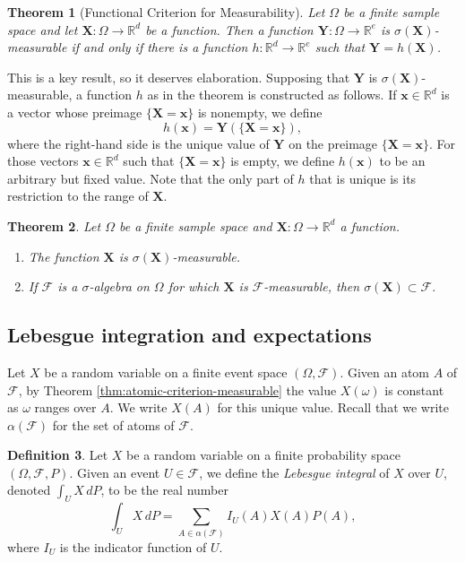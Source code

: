 \documentclass[reqno]{amsart}
\newtheorem{thm}{Theorem}[section]
\theoremstyle{definition}
\newtheorem{defn}[thm]{Definition}
\numberwithin{equation}{section}
\begin{document}
\begin{thm}[Functional Criterion for Measurability]\label{thm:functional-criterion-measurable}
Let $\Omega$ be a finite sample space and let $\mathbf{X}: \Omega \to \mathbb{R}^d$ be a function. Then a function $\mathbf{Y}: \Omega \to \mathbb{R}^e$ is $\sigma(\mathbf{X})$-measurable if and only if there is a function $h: \mathbb{R}^d \to \mathbb{R}^e$ such that $\mathbf{Y} = h(\mathbf{X})$.
\end{thm}

This is a key result, so it deserves elaboration. Supposing that $\mathbf{Y}$ is $\sigma(\mathbf{X})$-measurable, a function $h$ as in the theorem is constructed as follows. If $\mathbf{x}\in \mathbb{R}^d$ is a vector whose preimage $\{\mathbf{X} = \mathbf{x}\}$ is nonempty, we define
	\[
	h(\mathbf{x}) = \mathbf{Y}(\{\mathbf{X} = \mathbf{x}\}),
	\]
where the right-hand side is the unique value of $\mathbf{Y}$ on the preimage $\{\mathbf{X} = \mathbf{x}\}$. For those vectors $\mathbf{x}\in \mathbb{R}^d$ such that $\{\mathbf{X} = \mathbf{x}\}$ is empty, we define $h(\mathbf{x})$ to be an arbitrary but fixed value. Note that the only part of $h$ that is unique is its restriction to the range of $\mathbf{X}$.


\begin{thm}
Let $\Omega$ be a finite sample space and $\mathbf{X}: \Omega \to \mathbb{R}^d$ a function.
\begin{enumerate}
\item The function $\mathbf{X}$ is $\sigma(\mathbf{X})$-measurable.
\item If $\mathcal{F}$ is a $\sigma$-algebra on $\Omega$ for which $\mathbf{X}$ is $\mathcal{F}$-measurable, then $\sigma(\mathbf{X}) \subset \mathcal{F}$.
\end{enumerate}
\end{thm}

\subsection{Lebesgue integration and expectations}

Let $X$ be a random variable on a finite event space $(\Omega, \mathcal{F})$. Given an atom $A$ of $\mathcal{F}$, by Theorem \ref{thm:atomic-criterion-measurable} the value $X(\omega)$ is constant as $\omega$ ranges over $A$. We write $X(A)$ for this unique value. Recall that we write $\alpha(\mathcal{F})$ for the set of atoms of $\mathcal{F}$.

\begin{defn}
Let $X$ be a random variable on a finite probability space $(\Omega, \mathcal{F}, P)$. Given an event $U\in \mathcal{F}$, we define the \textit{Lebesgue integral} of $X$ over $U$, denoted $\int_U X \, dP$, to be the real number
	\[
	\int_U X \, dP = \sum_{A\in \alpha(\mathcal{F})} I_U(A)X(A)P(A),
	\]
where $I_U$ is the indicator function of $U$.
\end{defn}
\end{document}
